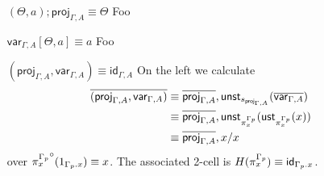 \documentclass[10pt]{article}
\theoremstyle{definition}
\newcommand\UStI[2]{\ensuremath{\mathsf{ust}_{#1}(#2)}}
\newcommand\UnSt[2]{\ensuremath{\mathsf{unst}_{#1}(#2)}}
\newcommand\TrCirc[2]{\ensuremath{{#1}^\circ(#2)}}
\newcommand\proj[1]{\ensuremath{\mathsf{proj}_{#1}}}
\newcommand\var[1]{\ensuremath{\mathsf{var}_{#1}}}
\newcommand{\id}{\mathsf{id}}
\begin{document}
\begin{enumerate}[style = multiline, labelwidth = 80pt]
\item[{$(\Theta, a);\proj{\Gamma,A} \equiv \Theta$}] Foo
\item[{$\var{\Gamma,A}[\Theta, a] \equiv a$}] Foo
\item[{$(\proj{\Gamma,A}, \var{\Gamma,A}) \equiv \id_{\Gamma, A}$}] 
On the left we calculate
\begin{align*}
\upstairs{(\proj{\Gamma,A}, \var{\Gamma,A})}
&\equiv \upstairs{\proj{\Gamma, A}} , \UnSt{s_{\proj{\Gamma, A}}}{\upstairs{\var{\Gamma, A}}} \\
&\equiv \upstairs{\proj{\Gamma, A}} , \UnSt{\pi^{\asdep{\Gamma}}_x}{\UStI{\pi^{\asdep{\Gamma}}_x}{x}} \\
&\equiv \upstairs{\proj{\Gamma, A}} , x / x
\end{align*}
over $\TrCirc{\pi^{\asdep{\Gamma}}_x}{1_{\asdep{\Gamma}.x}} \equiv x$. The associated 2-cell is $H(\pi^{\asdep{\Gamma}}_x) \equiv \id_{\asdep{\Gamma}.x}$.
\end{enumerate}
\end{document}
